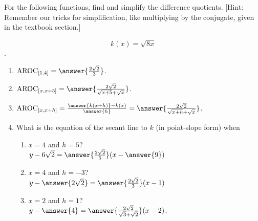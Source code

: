 \documentclass{ximera}
\author{Elizabeth Campolongo}
\begin{document}
\begin{exercise}

For the following functions, 
find and simplify the difference quotients. [Hint: Remember our tricks for simplification, like multiplying by the conjugate, given in the textbook section.]

 $$k(x)= \sqrt{8x}$$.

\begin{enumerate}

\item $\av_{[1,4]} = \answer{\frac{2\sqrt{2}}{3}}$.

\item $\av_{[x,x+5]} =  \answer{\frac{2\sqrt{2}}{\sqrt{x+5} + \sqrt{x}}}$.

\item $\av_{[x,x+h]} = \frac{\answer{k(x+h)}-k(x)}{\answer{h}}   = \answer{\frac{2\sqrt{2}}{\sqrt{x+h} + \sqrt{x}}}$.  

\item What is the equation of the secant line to $k$ (in point-slope form) when
\begin{enumerate}
\item $x = 4$ and $h=5$? \\
$y-6\sqrt{2} = \answer{\frac{2\sqrt{2}}{5}}(x-\answer{9})$

\item $x = 4$ and $h = -3$? \\
$y - \answer{2\sqrt{2}} = \answer{\frac{2\sqrt{2}}{3}}(x-1)$

\item $x = 2$ and $h= 1$? \\
$y - \answer{4} = \answer{\frac{2\sqrt{2}}{\sqrt{3} + \sqrt{2}}}(x-2)$.
\end{enumerate}

	
\end{enumerate}
\end{exercise}
\end{document}

